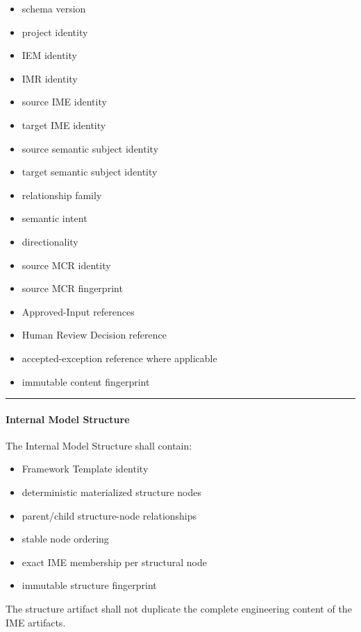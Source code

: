 \begin{itemize}
\tightlist
\item
  schema version
\item
  project identity
\item
  IEM identity
\item
  IMR identity
\item
  source IME identity
\item
  target IME identity
\item
  source semantic subject identity
\item
  target semantic subject identity
\item
  relationship family
\item
  semantic intent
\item
  directionality
\item
  source MCR identity
\item
  source MCR fingerprint
\item
  Approved-Input references
\item
  Human Review Decision reference
\item
  accepted-exception reference where applicable
\item
  immutable content fingerprint
\end{itemize}

\begin{center}\rule{0.5\linewidth}{0.5pt}\end{center}

\hypertarget{internal-model-structure}{%
\paragraph{Internal Model Structure}\label{internal-model-structure}}

The Internal Model Structure shall contain:

\begin{itemize}
\tightlist
\item
  Framework Template identity
\item
  deterministic materialized structure nodes
\item
  parent/child structure-node relationships
\item
  stable node ordering
\item
  exact IME membership per structural node
\item
  immutable structure fingerprint
\end{itemize}

The structure artifact shall not duplicate the complete engineering content of the IME artifacts.

